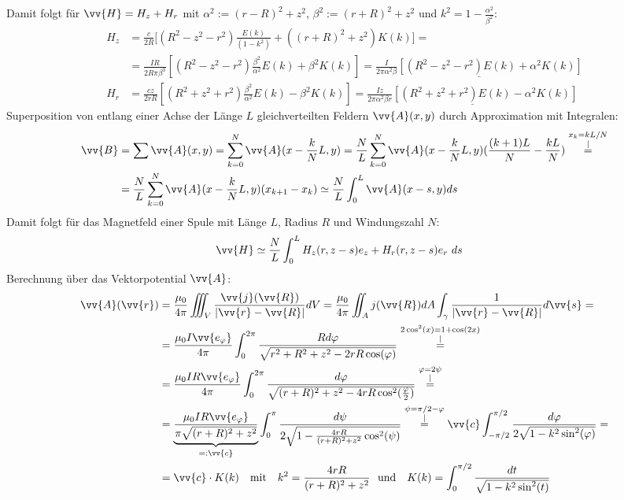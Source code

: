 \documentclass[a4paper,12pt]{article}
\begin{document}
Damit folgt für $\vv{H}=H_z+H_r$ mit $\alpha^2:=(r-R)^2+z^2$, $\beta^2:=(r+R)^2+z^2$ und $k^2=1-\frac{\alpha^2}{\beta^2}$:
\begin{align*}
H_z&=\frac{c}{2R}\bigg[(R^2-z^2-r^2)\frac{E(k)}{(1-k^2)}+((r+R)^2+z^2)K(k)\bigg]= \\
&=\frac{IR}{2R\pi\beta^3}\left[(R^2-z^2-r^2)\frac{\beta^2}{\alpha^2}E(k)+\beta^2K(k)\right]=\underline{\frac{I}{2\pi\alpha^2\beta}\left[(R^2-z^2-r^2)E(k)+\alpha^2K(k)\right]} \\
H_r&=\frac{cz}{2rR}\left[(R^2+z^2+r^2)\frac{\beta^2}{\alpha^2}E(k)-\beta^2K(k)\right]=\underline{\frac{Iz}{2\pi\alpha^2\beta r}\left[(R^2+z^2+r^2)E(k)-\alpha^2K(k)\right]}
\end{align*}
Superposition von entlang einer Achse der Länge $L$ gleichverteilten Feldern $\vv{A}(x, y)$ durch Approximation mit Integralen:
\begin{align*}
\vv{B}&=\sum \vv{A}(x, y)=\sum_{k=0}^N \vv{A}(x-\frac{k}{N} L, y)=\frac{N}{L}\sum_{k=0}^N \vv{A}(x-\frac{k}{N} L, y)(\frac{(k+1)L}{N}-\frac{kL}{N})\overset{\substack{x_k=kL/N \\|}}{=} \\
&=\frac{N}{L}\sum_{k=0}^N \vv{A}(x-\frac{k}{N} L, y)(x_{k+1}-x_k)\simeq\frac{N}{L}\int_0^L \vv{A}(x-s, y)ds
\end{align*}
Damit folgt für das Magnetfeld einer Spule mit Länge $L$, Radius $R$ und Windungszahl $N$:
\begin{align*}
\vv{H}&\simeq\frac{N}{L}\int_0^L H_z(r, z-s)e_z+H_r(r, z-s)e_r\ ds
\end{align*}
Berechnung über das Vektorpotential $\vv{A}$:
\begin{align*}
\vv{A}(\vv{r})&=\frac{\mu_0}{4\pi}\iiint_V \frac{\vv{j}(\vv{R})}{|\vv{r}-\vv{R}|}dV=\frac{\mu_0}{4\pi}\iint_A j(\vv{R})dA\int_{\gamma}\frac{1}{|\vv{r}-\vv{R}|}d\vv{s}=\\
&=\frac{\mu_0I\vv{e_{\varphi}}}{4\pi}\int_0^{2\pi}\frac{Rd\varphi}{\sqrt{r^2+R^2+z^2-2rR\cos(\varphi)}}\overset{\substack{2\cos^2(x)=1+\cos(2x)\\|}}{=}\\
&=\frac{\mu_0IR\vv{e_{\varphi}}}{4\pi}\int_0^{2\pi}\frac{d\varphi}{\sqrt{(r+R)^2+z^2-4rR\cos^2(\frac{\varphi}{2})}}\overset{\substack{\varphi=2\psi\\|}}{=} \\
&=\underbrace{\frac{\mu_0IR\vv{e_{\varphi}}}{\pi\sqrt{(r+R)^2+z^2}}}_{=:\vv{c}}\int_0^{\pi}\frac{d\psi}{2\sqrt{1-\frac{4rR}{(r+R)^2+z^2}\cos^2(\psi)}}\overset{\substack{\psi=\pi/2-\varphi\\|}}{=}\vv{c}\int_{-\pi/2}^{\pi/2}\frac{d\varphi}{2\sqrt{1-k^2\sin^2(\varphi)}}=\\
&=\vv{c}\cdot K(k)\ \ \textrm{ mit }\ \ k^2=\frac{4rR}{(r+R)^2+z^2}\ \ \textrm{und }\ \ K(k)=\int_0^{\pi/2}\frac{dt}{\sqrt{1-k^2\sin^2(t)}}
\end{align*}
\end{document}
